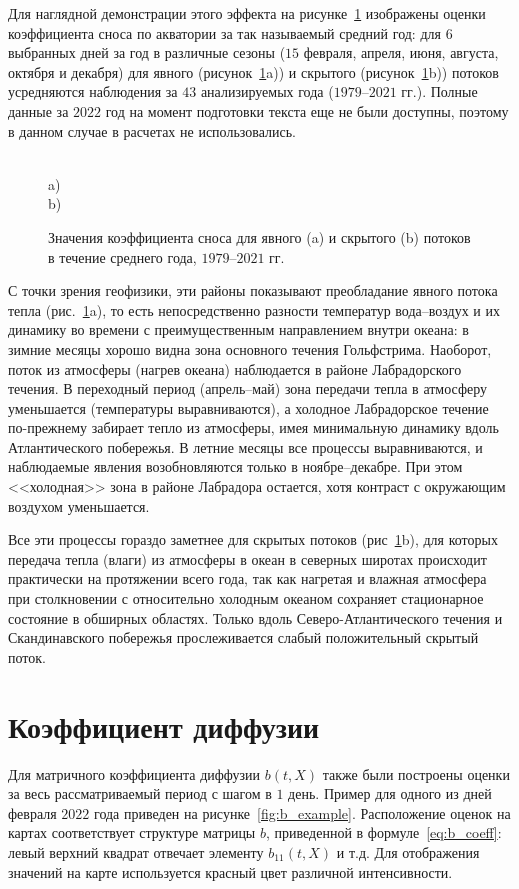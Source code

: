 Для наглядной демонстрации этого эффекта на рисунке~\ref{fig:ab_mean_year} изображены оценки коэффициента сноса по акватории за так называемый средний год: для $6$ выбранных дней за год в различные сезоны ($15$ февраля, апреля, июня, августа, октября и декабря) для явного (рисунок~\ref{fig:ab_mean_year}a)) и скрытого (рисунок~\ref{fig:ab_mean_year}b)) потоков усредняются наблюдения за $43$ анализируемых года ($1979$--$2021$ гг.). Полные данные за $2022$ год на момент подготовки текста еще не были доступны, поэтому в данном случае в расчетах не использовались.

\begin{figure}[h!]
	\\
	a)
	\\
	b)
	
	\caption{Значения коэффициента сноса для явного (a) и скрытого (b) потоков в течение среднего года, $1979$--$2021$ гг.} 
	\label{fig:ab_mean_year}
\end{figure}

С точки зрения геофизики, эти районы показывают преобладание явного потока тепла (рис.~\ref{fig:ab_mean_year}a), то есть непосредственно разности температур вода--воздух и их динамику во времени с преимущественным направлением внутри океана: в зимние месяцы хорошо видна зона основного течения Гольфстрима. Наоборот, поток из атмосферы (нагрев океана) наблюдается в районе Лабрадорского течения. В переходный период (апрель--май) зона передачи тепла в атмосферу уменьшается (температуры выравниваются), а холодное Лабрадорское течение по-прежнему забирает тепло из атмосферы, имея минимальную динамику вдоль Атлантического побережья. В летние месяцы все процессы выравниваются, и наблюдаемые явления возобновляются только в ноябре--декабре. При этом <<холодная>> зона в районе Лабрадора остается, хотя контраст с окружающим воздухом уменьшается.

Все эти процессы гораздо заметнее для скрытых потоков (рис~\ref{fig:ab_mean_year}b), для которых передача тепла (влаги) из атмосферы в океан в северных широтах происходит практически на протяжении всего года, так как нагретая и влажная атмосфера при столкновении с относительно холодным океаном сохраняет стационарное состояние в обширных областях. Только вдоль Северо-Атлантического течения и Скандинавского побережья прослеживается слабый положительный скрытый поток. 

\section{Коэффициент диффузии}
Для матричного коэффициента диффузии $b(t,X)$ также были построены оценки за весь рассматриваемый период с шагом в $1$ день. Пример для одного из дней февраля $2022$ года приведен на рисунке~\ref{fig:b_example}. Расположение оценок на картах соответствует структуре матрицы $b$, приведенной в формуле~\eqref{eq:b_coeff}: левый верхний квадрат отвечает элементу $b_{11}(t,X)$ и т.д. Для отображения значений на карте используется красный цвет различной интенсивности.

